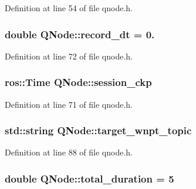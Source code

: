 Definition at line 54 of file qnode.\+h.

\subsubsection[{\texorpdfstring{record\+\_\+dt}{record_dt}}]{\setlength{\rightskip}{0pt plus 5cm}double Q\+Node\+::record\+\_\+dt = 0.}\hypertarget{class_q_node_ad1f3252201b932fc5d39b4f80349c7e2}{}\label{class_q_node_ad1f3252201b932fc5d39b4f80349c7e2}


Definition at line 72 of file qnode.\+h.

\subsubsection[{\texorpdfstring{session\+\_\+ckp}{session_ckp}}]{\setlength{\rightskip}{0pt plus 5cm}ros\+::\+Time Q\+Node\+::session\+\_\+ckp}\hypertarget{class_q_node_a147dc78b7181841f9b80711b14d371d4}{}\label{class_q_node_a147dc78b7181841f9b80711b14d371d4}


Definition at line 71 of file qnode.\+h.

\subsubsection[{\texorpdfstring{target\+\_\+wnpt\+\_\+topic}{target_wnpt_topic}}]{\setlength{\rightskip}{0pt plus 5cm}std\+::string Q\+Node\+::target\+\_\+wnpt\+\_\+topic\hspace{0.3cm}{\ttfamily [protected]}}\hypertarget{class_q_node_a978051ca9f7fc0c08a2e3b55aa87e7b7}{}\label{class_q_node_a978051ca9f7fc0c08a2e3b55aa87e7b7}


Definition at line 88 of file qnode.\+h.

\subsubsection[{\texorpdfstring{total\+\_\+duration}{total_duration}}]{\setlength{\rightskip}{0pt plus 5cm}double Q\+Node\+::total\+\_\+duration = 5}\hypertarget{class_q_node_a230cb427536b2173add5e35063bcc446}{}\label{class_q_node_a230cb427536b2173add5e35063bcc446}


